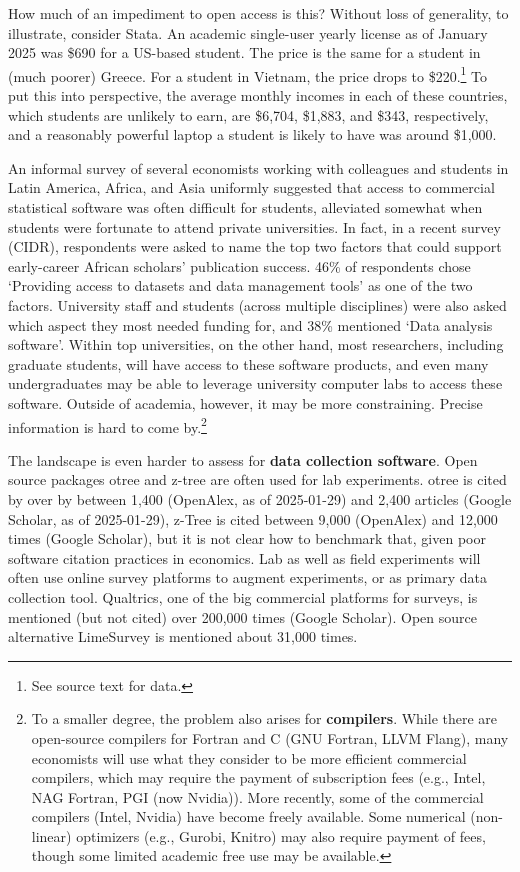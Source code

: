 \documentclass{article}
\begin{document}
How much of an impediment to open access is this? Without loss of generality, to illustrate, consider Stata. An academic single-user yearly license as of January 2025 was \$690 for a US-based student. The price is the same for a student in (much poorer) Greece. For a student in Vietnam, the price drops to \$220.\footnote{See source text for data.}  To put this into perspective, the average monthly incomes in each of these countries, which students are unlikely to earn, are \$6,704, \$1,883, and \$343, respectively, and a reasonably powerful laptop a student is likely to have was around \$1,000. 




An informal survey of several economists working with colleagues and students in Latin America, Africa, and Asia uniformly suggested that access to commercial statistical software was often difficult for students, alleviated somewhat when students were fortunate to attend private universities. In fact, in a recent survey (CIDR), respondents were asked to name the top two factors that could support early-career African scholars’ publication success. 46\% of respondents chose 
`Providing access to datasets and data management tools' as one of the two factors. University staff and students (across multiple disciplines) were also asked which aspect they  most needed funding for, and 38\% mentioned `Data analysis software'. Within top universities, on the other hand, most researchers, including graduate students, will have access to these software products, and even many undergraduates may be able to leverage university computer labs to access these software. Outside of academia, however, it may be more constraining. Precise information is hard to come by.\footnote{To a smaller degree, the problem also arises for \textbf{compilers}. While there are open-source compilers for Fortran and C (GNU Fortran, LLVM Flang), many economists will use what they consider to be more efficient commercial compilers, which may require the payment of  subscription fees (e.g., Intel, NAG Fortran, PGI (now Nvidia)). More recently, some of the commercial compilers (Intel, Nvidia) have become freely available. Some numerical (non-linear) optimizers (e.g., Gurobi, Knitro) may also require payment of fees, though some limited academic free use may be available.}

The landscape is even harder to assess for \textbf{data collection software}. Open source packages otree and z-tree are often used for lab experiments. otree is cited by over by between 1,400 (OpenAlex, as of 2025-01-29) and 2,400 articles (Google Scholar, as of 2025-01-29), z-Tree is cited between 9,000 (OpenAlex) and 12,000 times (Google Scholar), but it is not clear how to benchmark that, given poor software citation practices in economics. Lab as well as field experiments will often use online survey platforms to augment experiments, or as primary data collection tool. Qualtrics, one of the big commercial platforms for surveys, is mentioned (but not cited) over 200,000 times (Google Scholar). Open source alternative LimeSurvey is mentioned about 31,000 times.
\end{document}
